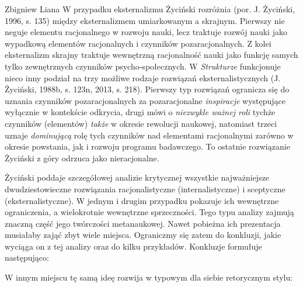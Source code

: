 \begin{artplenv}{Zbigniew Liana}
W przypadku eksternalizmu Życiński rozróżnia \label{ref:RNDAJVAwcgRgv}(por. J. Życiński, 1996, s. 135) między
eksternalizmem umiarkowanym a skrajnym. Pierwszy nie neguje elementu racjonalnego w rozwoju nauki, lecz traktuje rozwój
nauki jako wypadkową elementów racjonalnych i czynników pozaracjonalnych. Z kolei eksternalizm skrajny traktuje
wewnętrzną racjonalność nauki jako funkcję samych tylko zewnętrznych czynników psycho-społecznych. W \textit{Strukturze}
funkcjonuje nieco inny podział na trzy możliwe rodzaje rozwiązań eksternalistycznych \label{ref:RNDcwjdYvX9ov}(J.
Życiński, 1988b, s. 123n, 2013, s. 218). Pierwszy typ rozwiązań ogranicza się do uznania czynników pozaracjonalnych za
pozaracjonalne \textit{inspiracje} występujące wyłącznie w kontekście odkrycia, drugi mówi o \textit{niezwykle ważnej roli}
tychże czynników (elementów) \textit{także} w okresie rewolucji naukowej, natomiast trzeci uznaje \textit{dominującą} rolę
tych czynników nad elementami racjonalnymi zarówno w okresie powstania, jak i rozwoju programu badawczego. To ostatnie
rozwiązanie Życiński z góry odrzuca jako nieracjonalne.

Życiński poddaje szczegółowej analizie krytycznej wszystkie najważniejsze dwudziestowieczne rozwiązania racjonalistyczne
(internalistyczne) i sceptyczne (eksternalistyczne). W jednym i drugim przypadku pokazuje ich wewnętrzne
ograniczenia, a wielokrotnie wewnętrzne sprzeczności. Tego typu analizy zajmują znaczną część jego twórczości metanaukowej. Nawet
pobieżna ich prezentacja musiałaby zająć zbyt wiele miejsca. Ograniczmy się zatem do konkluzji, jakie wyciąga on z tej
analizy oraz do kilku przykładów. Konkluzje formułuje następująco:

W innym miejscu tę samą ideę rozwija w typowym dla siebie retorycznym stylu:


\end{artplenv}
